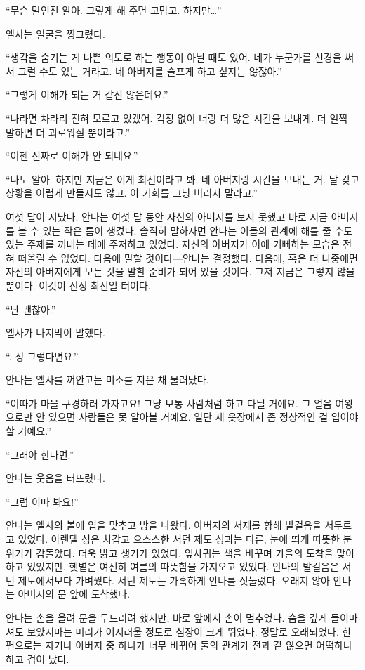 ``무슨 말인진 알아. 그렇게 해 주면 고맙고. 하지만\ldots''

엘사는 얼굴을 찡그렸다.

``생각을 숨기는 게 나쁜 의도로 하는 행동이 아닐 때도 있어. 네가 누군가를 신경을 써서 그럴 수도 있는 거라고. 네 아버지를 슬프게 하고 싶지는 않잖아.''

``그렇게 이해가 되는 거 같진 않은데요.''

``나라면 차라리 전혀 모르고 있겠어. 걱정 없이 너랑 더 많은 시간을 보내게. 더 일찍 말하면 더 괴로워질 뿐이라고.''

``이젠 진짜로 이해가 안 되네요.''

``나도 알아. 하지만 지금은 이게 최선이라고 봐, 네 아버지랑 시간을 보내는 거. 날 갖고 상황을 어렵게 만들지도 않고. 이 기회를 그냥 버리지 말라고.''

여섯 달이 지났다. 안나는 여섯 달 동안 자신의 아버지를 보지 못했고 바로 지금 아버지를 볼 수 있는 작은 틈이 생겼다. 솔직히 말하자면 안나는 이들의 관계에 해를 줄 수도 있는 주제를 꺼내는 데에 주저하고 있었다. 자신의 아버지가 이에 기뻐하는 모습은 전혀 떠올릴 수 없었다. 다음에 말할 것이다—안나는 결정했다. 다음에, 혹은 더 나중에면 자신의 아버지에게 모든 것을 말할 준비가 되어 있을 것이다. 그저 지금은 그렇지 않을 뿐이다. 이것이 진정 최선일 터이다.

``난 괜찮아.''

엘사가 나지막이 말했다.

``. 정 그렇다면요.''

안나는 엘사를 껴안고는 미소를 지은 채 물러났다.

``이따가 마을 구경하러 가자고요! 그냥 보통 사람처럼 하고 다닐 거예요. 그 얼음 여왕으로만 안 있으면 사람들은 못 알아볼 거예요. 일단 제 옷장에서 좀 정상적인 걸 입어야 할 거예요.''

``그래야 한다면.''

안나는 웃음을 터뜨렸다.

``그럼 이따 봐요!''

안나는 엘사의 볼에 입을 맞추고 방을 나왔다. 아버지의 서재를 향해 발걸음을 서두르고 있었다. 아렌델 성은 차갑고 으스스한 서던 제도 성과는 다른, 눈에 띄게 따뜻한 분위기가 감돌았다. 더욱 밝고 생기가 있었다. 잎사귀는 색을 바꾸며 가을의 도착을 맞이하고 있었지만, 햇볕은 여전히 여름의 따뜻함을 가져오고 있었다. 안나의 발걸음은 서던 제도에서보다 가벼웠다. 서던 제도는 가혹하게 안나를 짓눌렀다. 오래지 않아 안나는 아버지의 문 앞에 도착했다.

안나는 손을 올려 문을 두드리려 했지만, 바로 앞에서 손이 멈추었다. 숨을 깊게 들이마셔도 보았지마는 머리가 어지러울 정도로 심장이 크게 뛰었다. 정말로 오래되었다. 한편으로는 자기나 아버지 중 하나가 너무 바뀌어 둘의 관계가 전과 같 않으면 어떡하나 하고 겁이 났다.

